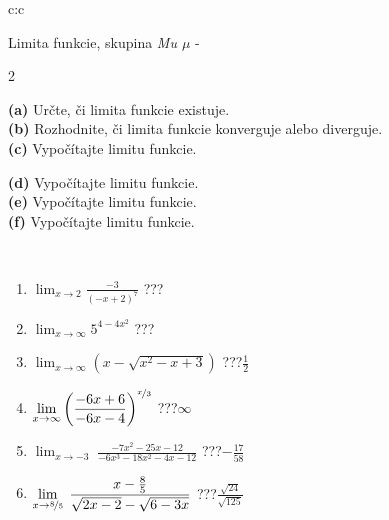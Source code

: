 \documentclass[10pt]{report}
\begin{document}
\newpage
\thispagestyle{empty}
\begin{tabular}{c:c}
\begin{minipage}[c][104.5mm][t]{0.5\linewidth}
\begin{center}
\vspace{7mm}
{\huge Limita funkcie, skupina \textit{Mu $\mu$} -}\\[5mm]
\begin{minipage}{0.95\linewidth}
\begin{center}
{\small \begin{multicols}{2} \raggedright
\textbf{(a)} Určte, či limita funkcie existuje. \\[1mm]
\textbf{(b)} Rozhodnite, či limita funkcie konverguje alebo diverguje. \\[1mm]
\textbf{(c)} Vypočítajte limitu funkcie. \par \columnbreak
\textbf{(d)} Vypočítajte limitu funkcie. \\[1mm]
\textbf{(e)} Vypočítajte limitu funkcie. \\[1mm]
\textbf{(f)} Vypočítajte limitu funkcie. \\[1mm]
\end{multicols}
}
\end{center}
\end{minipage}
\\[4mm]
\begin{minipage}{0.79\linewidth}
\begin{center}
\begin{varwidth}{\linewidth}
\begin{enumerate}
\normalsize
\item $\displaystyle\lim_{x\to2}{\frac{-3}{(-x+2)^{7}}}$\quad \dotfill\; ???\;\dotfill \quad {}
\item $\displaystyle\lim_{x\to\infty}{5^{4-4x^2}}$\quad \dotfill\; ???\;\dotfill \quad {}
\item $\displaystyle\lim_{x\to\infty}{\left(x - \sqrt{x^2-x+3}\right)}$\quad \dotfill\; ???\;\dotfill \quad $\frac{1}{2}$
\item $\displaystyle\lim_{x\to\infty}{\left( \frac{-6x+6}{-6x-4} \right)^{\nicefrac{x}{3}}}$\quad \dotfill\; ???\;\dotfill \quad $\infty$
\item $\displaystyle\lim_{x\to -3}{\;\frac{-7x^2-25x-12}{-6x^3-18x^2-4x-12}}$\quad \dotfill\; ???\;\dotfill \quad $-\frac{17}{58}$
\item $\displaystyle\lim_{x\to \nicefrac{8}{5}}{\;\frac{x-\frac{8}{5}}{\sqrt{2x-2} - \sqrt{6-3x}}}$\quad \dotfill\; ???\;\dotfill \quad $\frac{\sqrt{24}}{\sqrt{125}}$

\end{enumerate}
\end{varwidth}
\end{center}
\end{minipage}
\end{center}
\end{minipage}
\end{tabular}
\end{document}
